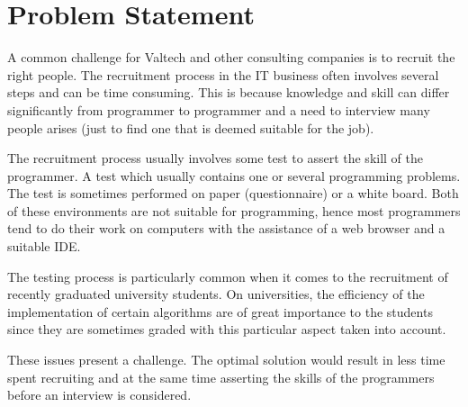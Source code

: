 \section{Problem Statement}
A common challenge for Valtech and other consulting companies is to recruit the right people. The recruitment process in the IT business often involves several steps and can be time consuming. This is because knowledge and skill can differ significantly from programmer to programmer and a need to interview many people arises (just to find one that is deemed suitable for the job).

The recruitment process usually involves some test to assert the skill of the programmer. A test which usually contains one or several programming problems. The test is sometimes performed on paper (questionnaire) or a white board. Both of these environments are not suitable for programming, hence most programmers tend to do their work on computers with the assistance of a web browser and a suitable IDE.

The testing process is particularly common when it comes to the recruitment of recently graduated university students. On universities, the efficiency of the implementation of certain algorithms are of great importance to the students since they are sometimes graded with this particular aspect taken into account.

These issues present a challenge. The optimal solution would result in less time spent recruiting and at the same time asserting the skills of the programmers before an interview is considered.
